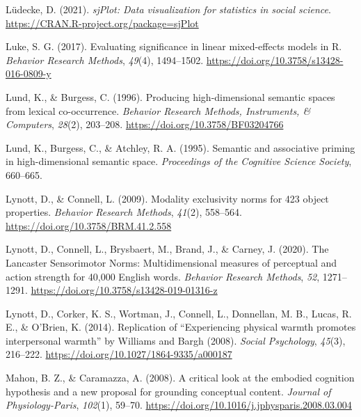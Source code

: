 \documentclass[
  12pt,
  man,floatsintext]{apa7}
\newlength{\cslhangindent}
\newlength{\cslentryspacingunit} %
\newenvironment{CSLReferences}[2] %
 {%
  \setlength{\parindent}{0pt}
  \ifodd #1
  \let\oldpar\par
  \def\par{\hangindent=\cslhangindent\oldpar}
  \fi
  \setlength{\parskip}{#2\cslentryspacingunit}
 }%
 {}
\begin{document}
\begin{CSLReferences}{1}{0}
\leavevmode{}%
Lüdecke, D. (2021). \emph{sjPlot: Data visualization for statistics in social science}. \url{https://CRAN.R-project.org/package=sjPlot}

\leavevmode{}%
Luke, S. G. (2017). Evaluating significance in linear mixed-effects models in {R}. \emph{Behavior Research Methods}, \emph{49}(4), 1494--1502. \url{https://doi.org/10.3758/s13428-016-0809-y}

\leavevmode{}%
Lund, K., \& Burgess, C. (1996). Producing high-dimensional semantic spaces from lexical co-occurrence. \emph{Behavior Research Methods, Instruments, \& Computers}, \emph{28}(2), 203--208. \url{https://doi.org/10.3758/BF03204766}

\leavevmode{}%
Lund, K., Burgess, C., \& Atchley, R. A. (1995). Semantic and associative priming in high-dimensional semantic space. \emph{Proceedings of the Cognitive Science Society}, 660--665.

\leavevmode{}%
Lynott, D., \& Connell, L. (2009). Modality exclusivity norms for 423 object properties. \emph{Behavior Research Methods}, \emph{41}(2), 558--564. \url{https://doi.org/10.3758/BRM.41.2.558}

\leavevmode{}%
Lynott, D., Connell, L., Brysbaert, M., Brand, J., \& Carney, J. (2020). The {Lancaster Sensorimotor Norms}: {Multidimensional} measures of perceptual and action strength for 40,000 {English} words. \emph{Behavior Research Methods}, \emph{52}, 1271--1291. \url{https://doi.org/10.3758/s13428-019-01316-z}

\leavevmode{}%
Lynott, D., Corker, K. S., Wortman, J., Connell, L., Donnellan, M. B., Lucas, R. E., \& O'Brien, K. (2014). Replication of {``{Experiencing} physical warmth promotes interpersonal warmth''} by {Williams} and {Bargh} (2008). \emph{Social Psychology}, \emph{45}(3), 216--222. \url{https://doi.org/10.1027/1864-9335/a000187}

\leavevmode{}%
Mahon, B. Z., \& Caramazza, A. (2008). A critical look at the embodied cognition hypothesis and a new proposal for grounding conceptual content. \emph{Journal of Physiology-Paris}, \emph{102}(1), 59--70. \url{https://doi.org/10.1016/j.jphysparis.2008.03.004}


\end{CSLReferences}
\end{document}
